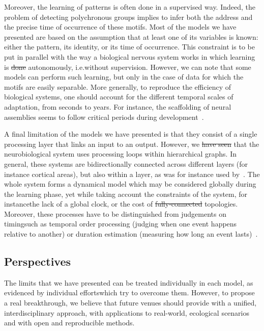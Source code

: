 \documentclass[brainsci, %
               review,accept,pdftex,moreauthors %
               ]{Definitions/mdpi}
\providecommand{\DIFadd}[1]{{\protect\color{blue}\uwave{#1}}} %
\providecommand{\DIFdel}[1]{{\protect\color{red}\sout{#1}}}                      %
\providecommand{\DIFaddbegin}{} %
\providecommand{\DIFaddend}{} %
\providecommand{\DIFdelbegin}{} %
\providecommand{\DIFdelend}{} %
\newcommand{\DIFscaledelfig}{0.5}
\newlength{\DIFdelgraphicswidth} %
\newlength{\DIFdelgraphicsheight} %
\newcommand{\DIFaddincludegraphics}[2][]{{\color{blue}\fbox{\DIFOincludegraphics[#1]{#2}}}} %
\newcommand{\DIFdelincludegraphics}[2][]{%
\sbox{\DIFdelgraphicsbox}{\DIFOincludegraphics[#1]{#2}}%
\settoboxwidth{\DIFdelgraphicswidth}{\DIFdelgraphicsbox} %
\settoboxtotalheight{\DIFdelgraphicsheight}{\DIFdelgraphicsbox} %
\scalebox{\DIFscaledelfig}{%
\parbox[b]{\DIFdelgraphicswidth}{\usebox{\DIFdelgraphicsbox}\\[-\baselineskip] \rule{\DIFdelgraphicswidth}{0em}}\llap{\resizebox{\DIFdelgraphicswidth}{\DIFdelgraphicsheight}{%
\setlength{\unitlength}{\DIFdelgraphicswidth}%
\begin{picture}(1,1)%
\thicklines\linethickness{2pt} %
{\color[rgb]{1,0,0}\put(0,0){\framebox(1,1){}}}%
{\color[rgb]{1,0,0}\put(0,0){\line( 1,1){1}}}%
{\color[rgb]{1,0,0}\put(0,1){\line(1,-1){1}}}%
\end{picture}%
}\hspace*{3pt}}} %
} %
\DeclareRobustCommand{\DIFaddbegin}{\DIFOaddbegin \let\includegraphics\DIFaddincludegraphics} %
\DeclareRobustCommand{\DIFaddend}{\DIFOaddend \let\includegraphics\DIFOincludegraphics} %
\DeclareRobustCommand{\DIFdelbegin}{\DIFOdelbegin \let\includegraphics\DIFdelincludegraphics} %
\DeclareRobustCommand{\DIFdelend}{\DIFOaddend \let\includegraphics\DIFOincludegraphics} %
\begin{document}
Moreover, the learning of patterns is often done in a supervised way. Indeed, the problem of detecting polychronous groups implies to infer both the address and the precise time of \DIFaddbegin \DIFadd{the }\DIFaddend occurrence of these motifs. Most of the models we have presented are based on the assumption that at least one of its variables is known: either the pattern, its identity, or its time of occurrence. This constraint is to be put in parallel with the way a biological nervous system works in which learning is \DIFdelbegin \DIFdel{done }\DIFdelend \DIFaddbegin \DIFadd{performed }\DIFaddend autonomously, i.e.\DIFaddbegin \DIFadd{, }\DIFaddend without supervision. However, we can note that some models can perform such learning, but only in the case of data for which the motifs are easily separable. More generally, to reproduce the efficiency of biological systems, one should account for the different temporal scales of adaptation, from seconds to years. For instance, the scaffolding of neural assemblies seems to follow critical periods during development~\citep{dard_rapid_2022}.

A final limitation of the models we have presented is that they consist of a single processing layer that links an input to an output. However, we \DIFdelbegin \DIFdel{have seen }\DIFdelend \DIFaddbegin \DIFadd{saw }\DIFaddend that the neurobiological system uses processing loops within hierarchical graphs. In general, these systems are bidirectionally connected across different layers (for instance cortical areas), but also within a layer, as was for instance used by~\citet{izhikevich_polychronization_2006}. The whole system forms a dynamical model which may be considered globally during the learning phase, yet while taking account the constraints of the system, for instance\DIFaddbegin \DIFadd{, }\DIFaddend the lack of a global clock, or the cost of \DIFdelbegin \DIFdel{fully-connected }\DIFdelend \DIFaddbegin \DIFadd{fully connected }\DIFaddend topologies. Moreover,  these processes have to be distinguished from judgements on timing\DIFaddbegin \DIFadd{, }\DIFaddend such as temporal order processing (judging when one event happens relative to another) or duration estimation (measuring how long an event lasts)~\citep{coull_distinction_2022}.
%
\subsection{Perspectives}
%
The limits that we have presented can be treated individually in each model, as evidenced by individual efforts\DIFaddbegin \DIFadd{, }\DIFaddend which try to overcome them. However, to propose a real breakthrough, we believe that future venues should provide with a unified, interdisciplinary approach, with applications to real-world, ecological scenarios and with open and reproducible methods. 
\end{document}

